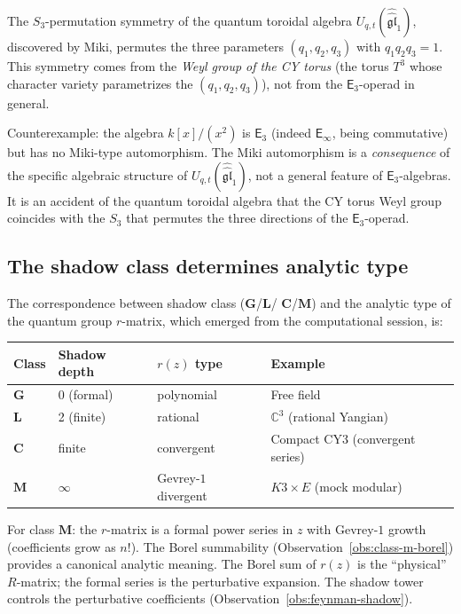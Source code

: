\documentclass[11pt]{article}
\newcommand{\fgl}{\mathfrak{gl}}
\newcommand{\C}{\mathbb{C}}
\newcommand{\Einf}{\mathsf{E}_{\infty}}
\begin{document}
\begin{remark}
\label{rem:miki-algebra-specific}
The $S_3$-permutation symmetry of the quantum toroidal algebra
$U_{q,t}(\widehat{\widehat{\fgl}}_1)$, discovered by Miki, permutes
the three parameters $(q_1, q_2, q_3)$ with $q_1 q_2 q_3 = 1$.
This symmetry comes from the \emph{Weyl group of the CY torus}
(the torus $T^3$ whose character variety parametrizes the
$(q_1, q_2, q_3)$), not from the $\mathsf{E}_3$-operad in general.

Counterexample: the algebra $k[x]/(x^2)$ is $\mathsf{E}_3$
(indeed $\Einf$, being commutative) but has no Miki-type
automorphism. The Miki automorphism is a \emph{consequence} of the
specific algebraic structure of $U_{q,t}(\widehat{\widehat{\fgl}}_1)$,
not a general feature of $\mathsf{E}_3$-algebras. It is an accident
of the quantum toroidal algebra that the CY torus Weyl group coincides
with the $S_3$ that permutes the three directions of the
$\mathsf{E}_3$-operad.
\end{remark}

\subsection{The shadow class determines analytic type}
\label{subsec:shadow-analytic}

The correspondence between shadow class ($\mathbf{G}$/$\mathbf{L}$/%
$\mathbf{C}$/$\mathbf{M}$) and the analytic type of the quantum group
$r$-matrix, which emerged from the computational session, is:

\begin{center}
\begin{tabular}{@{}llll@{}}
\toprule
Class & Shadow depth & $r(z)$ type & Example \\
\midrule
$\mathbf{G}$ & 0 (formal) & polynomial & Free field \\
$\mathbf{L}$ & 2 (finite) & rational & $\C^3$ (rational Yangian) \\
$\mathbf{C}$ & finite & convergent & Compact CY3 (convergent series) \\
$\mathbf{M}$ & $\infty$ & Gevrey-$1$ divergent & $K3 \times E$ (mock modular) \\
\bottomrule
\end{tabular}
\end{center}

\noindent For class $\mathbf{M}$: the $r$-matrix is a formal power
series in $z$ with Gevrey-$1$ growth (coefficients grow as $n!$).
The Borel summability (Observation~\ref{obs:class-m-borel}) provides
a canonical analytic meaning. The Borel sum of $r(z)$ is the
``physical'' $R$-matrix; the formal series is the perturbative
expansion. The shadow tower controls the perturbative coefficients
(Observation~\ref{obs:feynman-shadow}).
\end{document}
